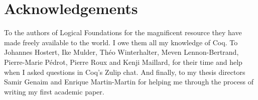 
\chapter*{Acknowledgements}
To the authors of Logical Foundations \cite{Pierce2017Logical} for the magnificent resource they have made freely
available to the world. I owe them all my knowledge of Coq. To Johannes Hostert, Ike Mulder, Théo Winterhalter,
Meven Lennon-Bertrand, Pierre-Marie Pédrot, Pierre Roux and Kenji Maillard, for their time and help when I asked 
questions in Coq's Zulip chat. And finally, to my thesis directors Samir Genaim and Enrique Martin-Martin for 
helping me through the process of writing my first academic paper.










